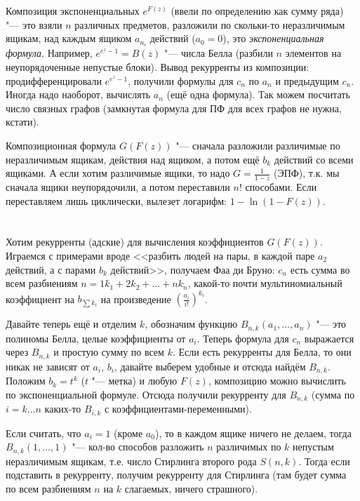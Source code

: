 \section{} %
	Композиция экспоненциальных $e^{F(z)}$ (ввели по определению как сумму ряда) "---
	это взяли $n$ различных предметов, разложили по скольки-то неразличимым ящикам, над каждым
	ящиком $a_{n_i}$ действий ($a_0 = 0$), это \textit{экспоненциальная формула}.
	Например, $e^{e^z-1}=B(z)$ "--- числа Белла (разбили $n$ элементов на неупорядоченные непустые блоки).
	Вывод рекурренты из композиции: продифференцировали $e^{e^z-1}$, получили формулы
	для $c_n$ по $a_n$ и предыдущим $c_n$.
	Иногда надо наоборот, вычислять $a_n$ (ещё одна формула).
	Так можем посчитать число связных графов (замкнутая формула для ПФ для всех графов не нужна, кстати).

	Композиционная формула $G(F(z))$ "--- сначала разложили различимые по неразличимым ящикам,
	действия над ящиком, а потом ещё $b_k$ действий со всеми ящиками.
	А если хотим различимые ящики, то надо $G=\frac{1}{1-z}$ (ЭПФ),
	т.к. мы сначала ящики неупорядочили, а потом переставили $n!$ способами.
	Если переставляем лишь циклически, вылезет логарифм: $1-\ln(1-F(z))$.

\section{} %
	Хотим рекурренты (адские) для вычисления коэффициентов $G(F(z))$.
	Играемся с примерами вроде <<разбить людей на пары, в каждой паре $a_2$ действий, а с парами $b_k$ действий>>,
	получаем Фаа ди Бруно: $c_n$ есть сумма во всем разбиениям $n=1k_1+2k_2+\dots+nk_n$,
	какой-то почти мультиномиальный коэффициент на $b_{\sum k_i}$ на произведение $\left(\frac{a_i}{i!}\right)^{k_i}$.
	
	Давайте теперь ещё и отделим $k$, обозначим функцию $B_{n,k}(a_1, \dots, a_n)$ "--- это полиномы
	Белла, целые коэффициенты от $a_i$.
	Теперь формула для $c_n$ выражается через $B_{n,k}$ и простую сумму по всем $k$.
	Если есть рекурренты для Белла, то они никак не зависят от $a_i$, $b_i$, давайте выберем удобные и отсюда найдём $B_{n,k}$.
	Положим $b_k=t^k$ ($t$ "--- метка) и любую $F(z)$, композицию можно вычислить по экспоненциальной формуле.
	Отсюда получили рекурренту для $B_{n,k}$ (сумма по $i=k\dots n$ каких-то $B_{i,k}$ с коэффициентами-переменными).

	Если считать, что $a_i=1$ (кроме $a_0$), то в каждом ящике ничего не делаем,
	тогда $B_{n,k}(1, \dots, 1)$ "--- кол-во способов разложить $n$ различимых по $k$ непустым неразличимым ящикам,
	т.е. число Стирлинга второго рода $S(n, k)$.
	Тогда если подставить в рекурренту, получим рекурренту для Стирлинга
	(там будет сумма по всем разбиениям $n$ на $k$ слагаемых, ничего страшного).


